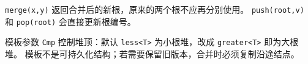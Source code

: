 \texttt{merge(x,y)} 返回合并后的新根，原来的两个根不应再分别使用。
\texttt{push(root,v)} 和 \texttt{pop(root)} 会直接更新根编号。

模板参数 \texttt{Cmp} 控制堆顶：默认 \texttt{less<T>} 为小根堆，改成 \texttt{greater<T>} 即为大根堆。
模板不是可持久化结构；若需要保留旧版本，合并时必须复制沿途结点。
